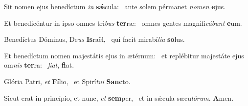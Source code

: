 \item Sit nomen ejus benedíctum \textit{in} \textbf{sǽ}cula:~\psstar{} ante solem pérmanet \textit{nomen} \textbf{e}jus.
\item Et benedicéntur in ipso omnes tri\textit{bus} \textbf{ter}ræ:~\psstar{} omnes gentes magnifi\textit{cábunt} \textbf{e}um.
\item Benedíctus Dóminus, De\textit{us} \textbf{Is}raël,~\psstar{} qui facit mirabí\textit{lia} \textbf{so}lus.
\item Et benedíctum nomen majestátis ejus in ætérnum:~\pscross{} et replébitur majestáte ejus om\textit{nis} \textbf{ter}ra:~\psstar{} \textit{fiat}, \textbf{fi}at.
\item Glória Patri, \textit{et} \textbf{Fí}lio,~\psstar{} et Spirí\textit{tui} \textbf{Sanc}to.
\item Sicut erat in princípio, et nunc, \textit{et} \textbf{sem}per,~\psstar{} et in sǽcula sæcu\textit{lórum}. \textbf{A}men.